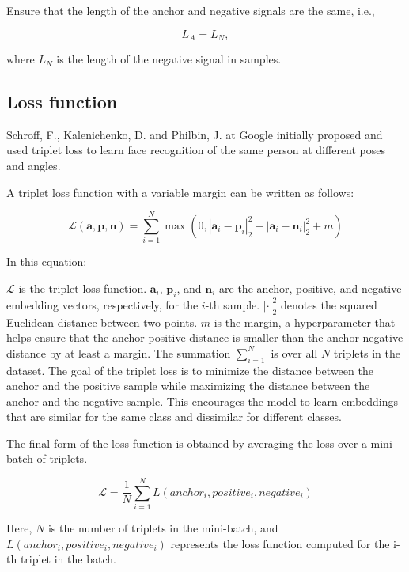 Ensure that the length of the anchor and negative signals are the same, i.e.,

\begin{equation}
L_A = L_N,
\end{equation}

where $L_N$ is the length of the negative signal in samples.

\subsection{Loss function}

Schroff, F., Kalenichenko, D. and Philbin, J. at Google initially proposed and used triplet loss to learn face recognition of the same person at different poses and angles. \cite{Schroff2015FaceNet:Clustering}

A triplet loss function with a variable margin can be written as follows:

\begin{equation}
\mathcal{L}(\mathbf{a}, \mathbf{p}, \mathbf{n}) = \sum_{i=1}^{N} \max \left(0, \left| \mathbf{a}_i - \mathbf{p}_i \right|_2^2 - \left| \mathbf{a}_i - \mathbf{n}_i \right|_2^2 + m \right)
\end{equation}

In this equation:

$\mathcal{L}$ is the triplet loss function.
$\mathbf{a}_i$, $\mathbf{p}_i$, and $\mathbf{n}_i$ are the anchor, positive, and negative embedding vectors, respectively, for the $i$-th sample.
$\left| \cdot \right|_2^2$ denotes the squared Euclidean distance between two points.
$m$ is the margin, a hyperparameter that helps ensure that the anchor-positive distance is smaller than the anchor-negative distance by at least a margin.
The summation $\sum_{i=1}^{N}$ is over all $N$ triplets in the dataset.
The goal of the triplet loss is to minimize the distance between the anchor and the positive sample while maximizing the distance between the anchor and the negative sample. This encourages the model to learn embeddings that are similar for the same class and dissimilar for different classes.

The final form of the loss function is obtained by averaging the loss over a mini-batch of triplets. 

\begin{equation}
\mathcal{L} = \frac{1}{N} \sum_{i=1}^{N} L(anchor_i, positive_i, negative_i)
\end{equation}

Here, $N$ is the number of triplets in the mini-batch, and $L(anchor_i, positive_i, negative_i)$ represents the loss function computed for the i-th triplet in the batch.